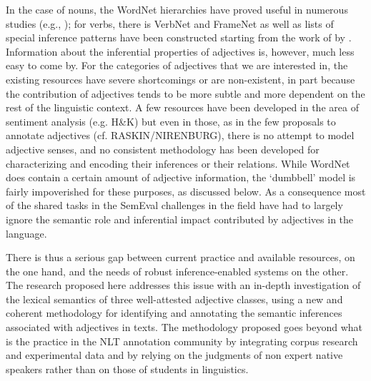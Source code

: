 \documentclass[10pt]{article}
\begin{document}


In the case of nouns, the WordNet hierarchies have proved useful in numerous studies (e.g., \cite{snow04}); for verbs, there is VerbNet and FrameNet as well as lists of special inference patterns have been constructed starting from the work of \cite{kiparsky+kiparsky:1970,karttunen:1971} by \cite{nairn+condoravdi+karttunen:2006,sauri:2008phd,factbank:2009,lotan:2012}. Information about the inferential properties of adjectives is, however, much less easy to come by. For the categories of adjectives that we are interested in, the existing resources have severe shortcomings or are non-existent, in part because the contribution of adjectives tends to be more subtle and more dependent on the rest of the linguistic context. A few resources have been developed in the area of sentiment analysis (e.g. H\&K) but even in those, as in the few proposals to annotate adjectives (cf. RASKIN/NIRENBURG), there is no attempt to model adjective senses, and no consistent methodology has been developed for characterizing and encoding their inferences or their relations. While WordNet does contain a certain amount of adjective information, the `dumbbell' model is fairly impoverished for these purposes, as discussed below. As a consequence most of the shared tasks in the SemEval challenges in the field have had to largely ignore the semantic role and inferential impact contributed by adjectives in the language.

There is thus a serious gap between current practice and available resources, on the one hand, and the needs of robust inference-enabled systems on the other. The research proposed here addresses this issue with an in-depth investigation of the lexical semantics of three well-attested adjective classes, using a new and coherent methodology for identifying and annotating the semantic inferences associated with adjectives in texts. The methodology proposed goes beyond what is the practice in the NLT annotation community by integrating corpus research and experimental data and by relying on the judgments of non expert native speakers rather than on those of students in linguistics.
\end{document}
